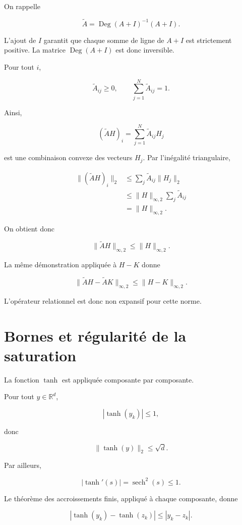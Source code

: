 On rappelle

\[
\widetilde A
=
\operatorname{Deg}(A+I)^{-1}(A+I).
\]

L'ajout de \(I\) garantit que chaque somme de ligne de \(A+I\) est
strictement positive. La matrice \(\operatorname{Deg}(A+I)\) est donc
inversible.

Pour tout \(i\),

\[
\widetilde A_{ij}\geq0,
\qquad
\sum_{j=1}^N\widetilde A_{ij}=1.
\]

Ainsi,

\[
(\widetilde A H)_i
=
\sum_{j=1}^N\widetilde A_{ij}H_j
\]

est une combinaison convexe des vecteurs \(H_j\). Par l'inégalité
triangulaire,

\[
\begin{aligned}
\|(\widetilde A H)_i\|_2
&\leq
\sum_j\widetilde A_{ij}\|H_j\|_2
\\
&\leq
\|H\|_{\infty,2}
\sum_j\widetilde A_{ij}
\\
&=
\|H\|_{\infty,2}.
\end{aligned}
\]

On obtient donc

\[
\boxed{
\|\widetilde A H\|_{\infty,2}
\leq
\|H\|_{\infty,2}.
}
\]

La même démonstration appliquée à \(H-K\) donne

\[
\boxed{
\|\widetilde A H-\widetilde A K\|_{\infty,2}
\leq
\|H-K\|_{\infty,2}.
}
\]

L'opérateur relationnel est donc non expansif pour cette norme.

\section{Bornes et régularité de la saturation}
\label{annexe-existence-tanh}

La fonction \(\tanh\) est appliquée composante par composante.

Pour tout \(y\in\mathbb R^d\),

\[
|\tanh(y_k)|\leq1,
\]

donc

\[
\boxed{
\|\tanh(y)\|_2\leq\sqrt d.
}
\]

Par ailleurs,

\[
|\tanh'(s)|=\operatorname{sech}^2(s)\leq1.
\]

Le théorème des accroissements finis, appliqué à chaque composante,
donne

\[
|\tanh(y_k)-\tanh(z_k)|
\leq
|y_k-z_k|.
\]


